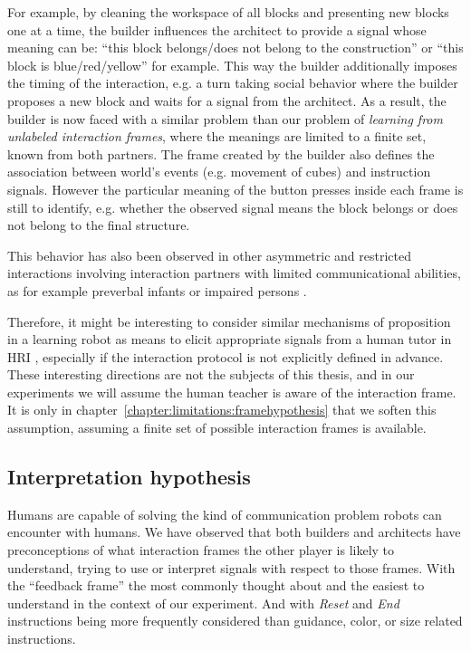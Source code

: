 For example, by cleaning the workspace of all blocks and presenting new blocks one at a time, the builder influences the architect to provide a signal whose meaning can be: ``this block belongs/does not belong to the construction'' or ``this block is blue/red/yellow'' for example. This way the builder additionally imposes the timing of the interaction, e.g. a turn taking social behavior where the builder proposes a new block and waits for a signal from the architect. As a result, the builder is now faced with a similar problem than our problem of \emph{learning from unlabeled interaction frames}, where the meanings are limited to a finite set, known from both partners. The frame created by the builder also defines the association between world's events (e.g. movement of cubes) and instruction signals. However the particular meaning of the button presses inside each frame is still to identify, e.g. whether the observed signal means the block belongs or does not belong to the final structure.

This behavior has also been observed in other asymmetric and restricted interactions involving interaction partners with limited communicational abilities, as for example preverbal infants or impaired persons \cite{ochs1979propositions, goodwin1995co}. 

Therefore, it might be interesting to consider similar mechanisms of proposition in a learning robot as means to elicit appropriate signals from a human tutor in HRI \cite{cakmak2012designing,vollmer2014robots,cangelosi2010integration}, especially if the interaction protocol is not explicitly defined in advance. These interesting directions are not the subjects of this thesis, and in our experiments we will assume the human teacher is aware of the interaction frame. It is only in chapter~\ref{chapter:limitations:framehypothesis} that we soften this assumption, assuming a finite set of possible interaction frames is available.

\subsection{Interpretation hypothesis}
\label{chapter:humanexperiment:interpretationhypothesis}

Humans are capable of solving the kind of communication problem robots can encounter with humans. We have observed that both builders and architects have preconceptions of what interaction frames the other player is likely to understand, trying to use or interpret signals with respect to those frames. With the ``feedback frame'' the most commonly thought about and the easiest to understand in the context of our experiment. And with \emph{Reset} and \emph{End} instructions being more frequently considered than guidance, color, or size related instructions.

